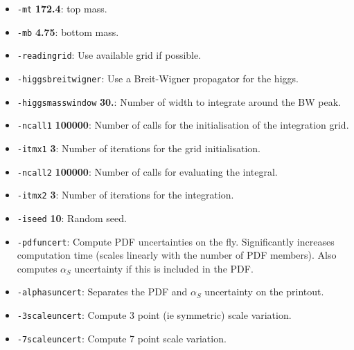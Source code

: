 \documentclass[12pt,a4]{article}
\begin{document}
\begin{itemize}
\item\texttt{-mt} {\bf 172.4}: top mass.

\item\texttt{-mb} {\bf 4.75}: bottom mass.
  
\item\texttt{-readingrid}: Use available grid if possible.

\item\texttt{-higgsbreitwigner}: Use a Breit-Wigner propagator for the higgs.

\item\texttt{-higgsmasswindow} {\bf 30.}: Number of width to integrate around the BW peak.
  
\item\texttt{-ncall1} {\bf 100000}: Number of calls for the initialisation of the integration grid.

\item\texttt{-itmx1} {\bf 3}: Number of iterations for the grid initialisation.
  
\item\texttt{-ncall2} {\bf 100000}: Number of calls for evaluating the integral.

\item\texttt{-itmx2} {\bf 3}: Number of iterations for the integration.

\item\texttt{-iseed} {\bf 10}: Random seed.

\item\texttt{-pdfuncert}: Compute PDF uncertainties on the fly. Significantly increases computation time (scales linearly with the number of PDF members). Also computes $\alpha_S$ uncertainty if this is included in the PDF.

\item\texttt{-alphasuncert}: Separates the PDF and $\alpha_S$ uncertainty on the printout.

\item\texttt{-3scaleuncert}: Compute 3 point (ie symmetric) scale variation.

\item\texttt{-7scaleuncert}: Compute 7 point scale variation.

\end{itemize}
\end{document}
